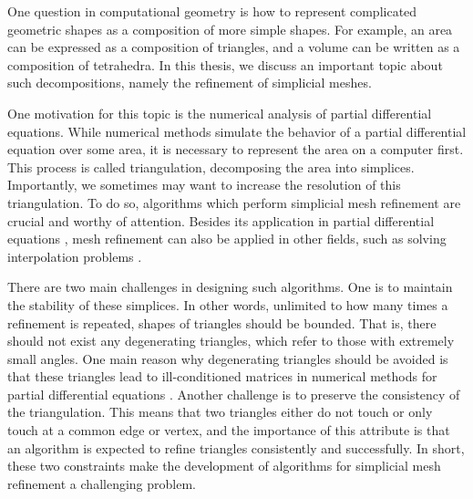 One question in computational geometry is how to represent complicated geometric shapes as a composition of more simple shapes. For example, an area can be expressed as a composition of triangles, and a volume can be written as a composition of tetrahedra. In this thesis, we discuss an important topic about such decompositions, namely the refinement of simplicial meshes.

One motivation for this topic is the numerical analysis of partial differential equations. While numerical methods simulate the behavior of a partial differential equation over some area, it is necessary  to represent the area on a computer first. This process is called triangulation, decomposing the area into simplices. Importantly, we sometimes may want to increase the resolution of this triangulation. To do so, algorithms which perform simplicial mesh refinement are crucial and worthy of attention. Besides its application in partial differential equations \cite{grosso1998hierarchical}, mesh refinement can also be applied in other fields, such as solving interpolation problems \cite{moore1992simplical}.

There are two main challenges in designing such algorithms. One is to maintain the stability of these simplices. In other words, unlimited to how many times a refinement is repeated, shapes of triangles should be bounded. That is, there should not exist any degenerating triangles, which refer to those with extremely small angles. One main reason why degenerating triangles should be avoided is that these triangles lead to ill-conditioned matrices in numerical methods for partial differential equations \cite{bank1989conditioning}. Another challenge is to  preserve the consistency of the triangulation. This means that two triangles either do not touch or only touch at a common edge or vertex, and the importance of this attribute is that an algorithm is expected to refine triangles consistently and successfully. In short, these two constraints make the development of algorithms for simplicial mesh refinement a challenging problem.

